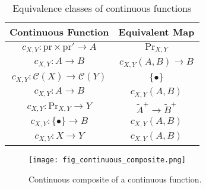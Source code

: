 \documentclass[a4paper,reqno,oneside]{article}
\begin{document}
\begin{table}
    \centering
    \caption{Equivalence classes of continuous functions}
    \label{table:continuous_functions}
    \begin{tabular}{|c | c |}
        \hline
        Continuous Function     & Equivalent Map            \\
        \hline
        $c_{X,Y} : \mathrm{pr} \times \mathrm{pr'} \to A$    & $\mathrm{Pr}_{X,Y}$         \\
        $c_{X,Y} : A \to B$   & $c_{X,Y}(A,B) \to B$       \\
        $c_{X,Y}: \mathcal{C}(X) \to \mathcal{C}(Y)$ & $\{\bullet\}$                  \\
        $c_{X,Y}: A \to B$       & $c_{X,Y}(A,B)$          \\
        $c_{X,Y} : \mathrm{Pr}_{X,Y} \to Y$        & $\widetilde{A}^+ \to \widetilde{B}^+$   \\
        $c_{X,Y} : \{\bullet\} \to B$           & $c_{X,Y}(A,B)$              \\
        $c_{X,Y} : X \to Y$               & $c_{X,Y}(A,B)$                \\
        \hline
    \end{tabular}
\end{table}


\begin{figure}[ht]
\centering
\texttt{[image: fig\_continuous\_composite.png]}
\caption{Continuous composite of a continuous function.}
\label{fig:continuous_composite}
\end{figure}
\end{document}
